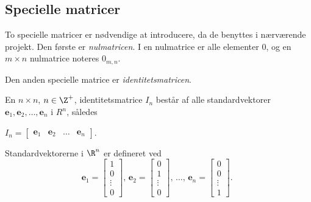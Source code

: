 \subsection{Specielle matricer} %

To specielle matricer er nødvendige at introducere, da de benyttes i nærværende projekt. Den første er \textit{nulmatricen}. I en nulmatrice er alle elementer $0$, og en $m \times n$ nulmatrice noteres $0_{m,n}$. 

Den anden specielle matrice er \textit{identitetsmatricen}. 

\begin{defn}{}{}
En $n \times n$, $n \in \Z^+$, identitetsmatrice $I_n$ består af alle standardvektorer $\textbf{e}_1, \textbf{e}_2, \ldots, \textbf{e}_n$ i $R^n$, således 

$
I_n=
\begin{bmatrix}
\textbf{e}_1 & \textbf{e}_2 & \ldots & \textbf{e}_n
\end{bmatrix}
$. 

\end{defn}

Standardvektorerne i $\R^n$ er defineret ved 
$$
\textbf{e}_1=
\begin{bmatrix}
1 \\ 
0 \\ 
\vdots \\
0
\end{bmatrix}
\text{, }
\textbf{e}_2=
\begin{bmatrix}
0 \\ 
1 \\ 
\vdots \\
0
\end{bmatrix}
\text{, }
\ldots
\text{, }
\textbf{e}_n=
\begin{bmatrix}
0 \\ 
0 \\ 
\vdots \\
1
\end{bmatrix}
\text{. }
$$

